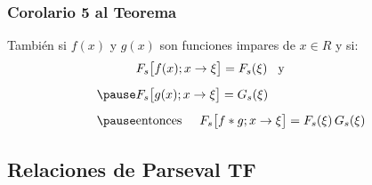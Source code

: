 \begin{frame}
\frametitle{Corolario 5 al Teorema}  
También si $f (x)$ y $g (x)$ son funciones impares de $x \in R$ y si:
\pause
\begin{eqnarray}
\begin{aligned}[b]
&F_{s} \big[f (x); x \to \xi \big] = F_{s}(\xi) \hspace{0.3cm} \mbox{y} \\[0.5em] \pause
&F_{s} \big[g (x); x \to \xi \big] = G_{s}(\xi) \\[0.5em] \pause
&\mbox{entonces} \hspace{0.5cm} F_{s} \big[f * g; x \to \xi \big] = F_{s} (\xi) \, G_{s}(\xi) 
\end{aligned}
\label{eq:ecuacion_01_29}
\end{eqnarray}
\end{frame}

\subsection{Relaciones de Parseval TF}

